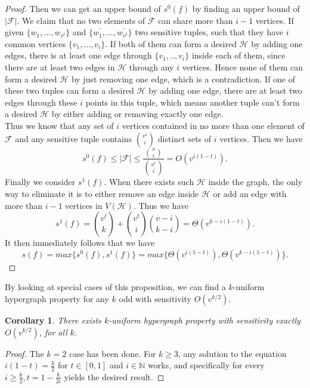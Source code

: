 \documentclass[psamsfonts]{amsart}
\newtheorem{cor}[theorem]{Corollary}
\theoremstyle{definition}
\theoremstyle{remark}
\numberwithin{equation}{section}
\begin{document}
\begin{proof}
		Then we can get an upper bound of $s^0(f)$ by finding an upper bound of $|\mathcal{F}|$. We claim that no two elements of $\mathcal{F}$ can share more than $i-1$ vertices. If given $\{w_1,...,w_{v^t}\}$ and $\{w_1^\prime,...,w_{v^t}^\prime\}$ two sensitive tuples, such that they have $i$ common vertices $\{v_1,...,v_i\}$. If both of them can form a desired $\mathcal{H}$ by adding one edges, there is at least one edge through $\{v_1,..,v_i\}$ inside each of them, since there are at least two edges in $\mathcal{H}$ through any $i$ vertices. Hence none of them can form a desired $\mathcal{H}$ by just removing one edge, which is a contradiction. If one of these two tuples can form a desired $\mathcal{H}$ by adding one edge, there are at least two edges through these $i$ points in this tuple, which means another tuple can't form a desired $\mathcal{H}$ by either adding or removing exactly one edge.\\
		\indent Thus we know that any set of $i$ vertices contained in no more than one element of $\mathcal{F}$ and any sensitive tuple contains $v^t \choose{i}$ distinct sets of $i$ vertices. Then we have
		\begin{equation}
			s^0(f) \leq |\mathcal{F}| \leq \frac{{v \choose{i}}}{{v^t \choose{i}}} = O(v^{i(1-t)}). \nonumber
		\end{equation}
		Finally we consider $s^1(f)$. When there exists such $\mathcal{H}$ inside the graph, the only way to eliminate it is to either remove an edge inside $\mathcal{H}$ or add an edge with more than $i-1$ vertices in $V(\mathcal{H})$. Thus we have
		\begin{equation}
			s^1(f) = {v^t \choose{k}} + {v^t \choose{i}}{v-i \choose{k-i}} = \Theta (v^{k-i(1-t)}). \nonumber
		\end{equation}
		It then immediately follows that we have
		\begin{equation}
			s(f)= max\{s^0(f),s^1(f)\} = max\{ \Theta(v^{i(1-t)}),  \Theta(v^{k-i(1-t)})\}. \nonumber
		\end{equation}
	\end{proof}
	By looking at special cases of this proposition, we can find a $k$-uniform hypergraph property for any $k$ odd with sensitivity $O(v^{k/2})$.
	\begin{cor}
		There exists $k$-uniform hypergraph property with sensitivity exactly $O(v^{k/2})$, for all $k$.
	\end{cor}
	\begin{proof}
		The $k=2$ case has been done. For $k\geq 3$, any solution to the equation $i(1-t)=\frac{k}{2}$ for $t\in[0,1]$ and $i\in\mathbb{N}$ works, and specifically for every $i\geq\frac{k}{2}, t=1-\frac{k}{2i}$ yields the desired result.
	\end{proof}
\end{document}
